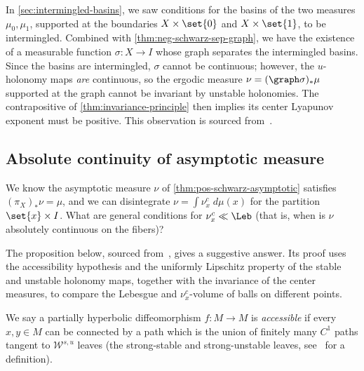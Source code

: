 \documentclass[../main]{subfiles}
\begin{document}
In \cref{sec:intermingled-basins}, we saw conditions for the basins of the two measures \(\mu_0,\mu_1\), supported at the boundaries \(X \times \set{0}\) and \(X \times \set{1}\), to be intermingled. Combined with \cref{thm:neg-schwarz-sep-graph}, we have the existence of a measurable function \(\sigma \colon X \to I\) whose graph separates the intermingled basins. Since the basins are intermingled, \(\sigma\) cannot be continuous; however, the \(u\)-holonomy maps \emph{are} continuous, so the ergodic measure \(\nu = (\graph \sigma)_*\mu\) supported at the graph cannot be invariant by unstable holonomies. The contrapositive of \cref{thm:invariance-principle} then implies its center Lyapunov exponent must be positive. This observation is sourced from~\cite[Section 4.2]{duarteMeasuresMaximalEntropy2022}.


\subsection{Absolute continuity of asymptotic measure}

\begin{question}
  We know the asymptotic measure \(\nu\) of \cref{thm:pos-schwarz-asymptotic} satisfies \((\pi_X)_*\nu = \mu\), and we can disintegrate \(\nu = \int \nu^c_x \;d\mu(x)\) for the partition \(\set{x}\times I\). What are general conditions for \(\nu^c_x \ll \Leb\) (that is, when is \(\nu\) absolutely continuous on the fibers)?
\end{question}

The proposition below, sourced from~\cite[Proposition 6.7]{crovisierInvariancePrincipleNoncompact2023}, gives a suggestive answer. Its proof uses the accessibility hypothesis and the uniformly Lipschitz property of the stable and unstable holonomy maps, together with the invariance of the center measures, to compare the Lebesgue and \(\nu^c_x\)-volume of balls on different points.

\begin{definition}
  We say a partially hyperbolic diffeomorphism \(f \colon M \to M\) is \emph{accessible} if every \(x, y \in M\) can be connected by a path which is the union of finitely many \(C^1\) paths tangent to \(\mathcal{W}^{s,u}\) leaves (the strong-stable and strong-unstable leaves, see~\cite{crovisierIntroductionPartiallyHyperbolic} for a definition).
\end{definition}
\end{document}
